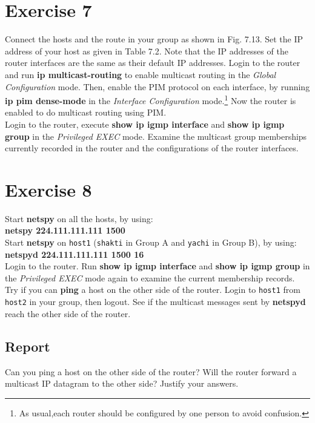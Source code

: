 \documentclass[10pt,a4paper]{article}
\numberwithin{equation}{section}
\numberwithin{figure}{section}
\numberwithin{table}{section}
\begin{document}
    \section{ Exercise 7}
    Connect the hosts and the route in your group as shown in Fig. 7.13. Set the IP address of your host as given in Table 7.2. Note that the IP addresses of the router interfaces are the same as their default IP addresses.
    Login to the router and run \textbf{ip multicast-routing} to enable multicast routing in the \textit{Global Configuration} mode.
    Then, enable the PIM protocol on each interface, by running \textbf{ip pim dense-mode} in the \textit{Interface Configuration} mode.\footnote{As usual,each router should be configured by one person to avoid confusion.} Now the router is enabled to do multicast routing using PIM. \\
    Login to the router, execute \textbf{show ip igmp interface} and \textbf{show ip igmp group} in the \textit{Privileged EXEC} mode.
    Examine the multicast group memberships currently recorded in the router and the configurations of the router interfaces.

    \section{ Exercise 8}
    Start \textbf{netspy} on all the hosts, by using: \\
    \textbf{netspy 224.111.111.111 1500} \\
    Start \textbf{netspy} on \texttt{host1} (\texttt{shakti} in Group A and \texttt{yachi} in Group B), by using: \\
    \textbf{netspyd 224.111.111.111 1500 16} \\
    Login to the router.
    Run \textbf{show ip igmp interface} and \textbf{show ip igmp group} in the \textit{Privileged EXEC} mode again to examine the current membership records. \\
    Try if you can \textbf{ping} a host on the other side of the router.
    Login to \texttt{host1} from \texttt{host2} in your group, then logout.
    See if the multicast messages sent by \textbf{netspyd} reach the other side of the router.
    \subsection*{Report}
    Can you ping a host on the other side of the router?
    Will the router forward a multicast IP datagram to the other side?
    Justify your answers.
\end{document}
